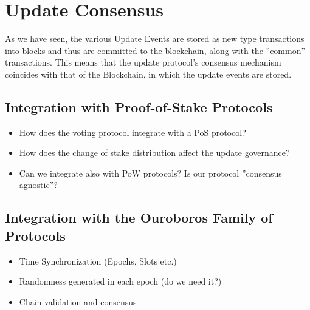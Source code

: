 \section{Update Consensus}
As we have seen, the various Update Events are stored as new type transactions into blocks and thus are committed to the blockchain, along with the ''common'' transactions. This means that the update protocol's consensus mechanism coincides with that of the Blockchain, in which the update events are stored.


\subsection*{Integration with Proof-of-Stake Protocols}
\begin{itemize}
\item How does the voting protocol integrate with a PoS protocol?
\item How does the change of stake distribution affect the update governance?
\item Can we integrate also with PoW protocols? Is our protocol ''consensus agnostic''?
\end{itemize}


\subsection*{Integration with the Ouroboros Family of Protocols}
\begin{itemize}
\item Time Synchronization (Epochs, Slots etc.)
\item Randomness generated in each epoch (do we need it?)
\item Chain validation and consensus
\end{itemize}